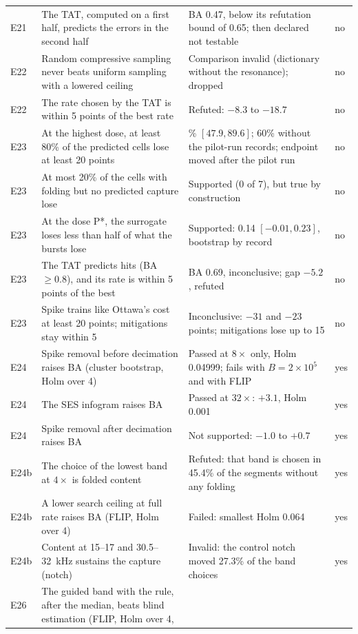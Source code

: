 {\begin{longtable}{@{}>{\raggedright\arraybackslash}p{}%
  >{\raggedright\arraybackslash}p{}%
  >{\raggedright\arraybackslash}p{}p{}@{}}
E21 & The TAT, computed on a first half, predicts the errors in the second half & BA 0.47, below its
  refutation bound of 0.65; then declared not testable & no \\
E22 & Random compressive sampling never beats uniform sampling with a lowered ceiling &
  Comparison invalid (dictionary without the resonance); dropped & no \\
E22 & The rate chosen by the TAT is within 5 points of the best rate & Refuted: $-8.3$ to $-18.7$
  & no \\
E23 & At the highest dose, at least 80\% of the predicted cells lose at least 20 points & 85.4\%
  $[47.9, 89.6]$; 60\% without the pilot-run records; endpoint moved after the pilot run & no \\
E23 & At most 20\% of the cells with folding but no predicted capture lose & Supported (0 of 7),
  but true by construction & no \\
E23 & At the dose P*, the surrogate loses less than half of what the bursts lose & Supported:
  0.14 $[-0.01, 0.23]$, bootstrap by record & no \\
E23 & The TAT predicts hits (BA $\geq 0.8$), and its rate is within 5 points of the best & BA 0.69,
  inconclusive; gap $-5.2$, refuted & no \\
E23 & Spike trains like Ottawa's cost at least 20 points; mitigations stay within 5 & Inconclusive:
  $-31$ and $-23$ points; mitigations lose up to 15 & no \\
E24 & Spike removal before decimation raises BA (cluster bootstrap, Holm over 4) & Passed at
  $8\times$ only, Holm 0.04999; fails with $B = 2\times10^5$ and with FLIP & yes \\
E24 & The SES infogram raises BA & Passed at $32\times$: $+3.1$, Holm 0.001 & yes \\
E24 & Spike removal after decimation raises BA & Not supported: $-1.0$ to $+0.7$ & yes \\
E24b & The choice of the lowest band at $4\times$ is folded content & Refuted: that band is chosen
  in 45.4\% of the segments without any folding & yes \\
E24b & A lower search ceiling at full rate raises BA (FLIP, Holm over 4) & Failed: smallest Holm
  0.064 & yes \\
E24b & Content at 15--17 and 30.5--32~kHz sustains the capture (notch) & Invalid: the control
  notch moved 27.3\% of the band choices & yes \\
E26 & The guided band with the rule, after the median, beats blind estimation (FLIP, Holm over 4,

\end{longtable}}
